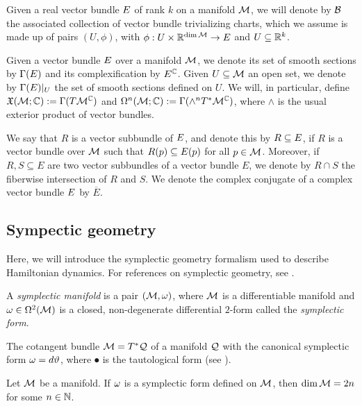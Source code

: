 \documentclass[notas.tex]{subfiles}
\begin{document}
Given a real vector bundle $E$ of rank $k$ on a manifold $\mathcal{M}$, we will denote by $\mathcal{B}$ the associated collection of vector bundle trivializing charts, which we assume is made up of pairs $(U, \phi)$, with $\phi: U \times \mathbb{R}^{\dim \mathcal{M}} \to E$ and $U \subseteq \mathbb{R}^k$. 

Given a vector bundle $E$ over a manifold $\mathcal{M}$, we denote its set of smooth sections by $\Gamma(E)$ and its complexification by $E^{\mathbb{C}}$. Given $U \subseteq \mathcal{M}$ an open set, we denote by $\Gamma(E)|_U$ the set of smooth sections defined on $U$. We will, in particular, define $\mathfrak{X}(\mathcal{M}; \mathbb{C}) := \Gamma(T\mathcal{M}^{\mathbb{C}})$ and $\Omega^n(\mathcal{M}; \mathbb{C}) := \Gamma(\wedge^n T^*\mathcal{M}^{\mathbb{C}})$, where $\wedge$ is the usual exterior product of vector bundles.

We say that $R$ is a vector subbundle of $E$, and denote this by $R \subseteq E$, if $R$ is a vector bundle over $\mathcal{M}$ such that $R(p) \subseteq E(p)$ for all $p \in \mathcal{M}$. Moreover, if $R,S \subseteq E$ are two vector subbundles of a vector bundle $E$, we denote by $R \cap S$ the fiberwise intersection of $R$ and $S$. We denote the complex conjugate of a complex vector bundle $E$ by $\overline E$. \\

\subsection{Sympectic geometry} \label{sec_sg}

Here, we will introduce the symplectic geometry formalism used to describe Hamiltonian dynamics. For references on symplectic geometry, see \cite{cannas_da_silva_lectures_2001, mcduff_introduction_2017}.

\begin{defn}
	A \emph{symplectic manifold} is a pair $(\mathcal{M},\omega)$, where $\mathcal{M}$ is a differentiable manifold and $\omega \in \Omega^{2}(\mathcal{M})$ is a closed, non-degenerate differential $2$-form called the \emph{symplectic form}.
\end{defn}
\begin{ex}\label{ex_cotangent_bundle}
	The cotangent bundle $\mathcal{M} = T^*\mathcal{Q}$ of a manifold $\mathcal{Q}$ with the canonical symplectic form $\omega = d \vartheta$, where $\spot$ is the tautological form (see \cite[Ch. 2]{cannas_da_silva_lectures_2001}).
\end{ex}

\begin{lem}\label{lem_sform_even_dim}
	Let $\mathcal{M}$ be a manifold. If $\omega$ is a symplectic form defined on $\mathcal{M}$, then $\dim \mathcal{M} = 2n$ for some $n \in \mathbb{N}$.
\end{lem}
\end{document}
